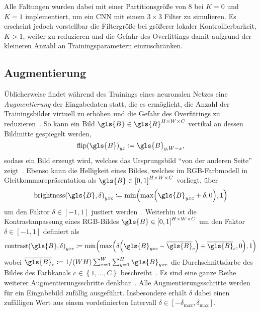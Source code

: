 Alle Faltungen wurden dabei mit einer Partitionsgröße von $8$ bei $K=0$ und $K=1$ implementiert, um ein \gls{CNN} mit einem $3 \times 3$ Filter zu simulieren.
Es erscheint jedoch vorstellbar die Filtergröße bei größerer lokaler Kontrollierbarkeit, \dhe{} $K > 1$, weiter zu reduzieren und die Gefahr des Overfittings damit aufgrund der kleineren Anzahl an Trainingsparametern einzuschränken.

\subsection{Augmentierung}
\label{augmentierung}

Üblicherweise findet während des Trainings eines neuronalen Netzes eine \emph{Augmentierung} der Eingabedaten statt, die es ermöglicht, die Anzahl der Trainingsbilder virtuell zu erhöhen und die Gefahr des Overfittings zu reduzieren~\cite{tensorflow}.
So kann \zB{} ein Bild $\gls{B} \in \gls{R}^{H \times W \times C}$ vertikal an dessen Bildmitte gespiegelt werden, \dhe{}
\begin{equation*}
  {\mathrm{flip}\left(\gls{B}\right)}_{yx} \coloneqq \gls{B}_{y,W-x},
\end{equation*}
sodass ein Bild erzeugt wird, welches das Ursprungsbild \enquote{von der anderen Seite} zeigt~\cite{tensorflow}.
Ebenso kann die Helligkeit eines Bildes, welches im RGB-Farbmodell in Gleitkommarepräsentation als $\gls{B} \in {\left[0, 1\right]}^{H \times W \times C}$ vorliegt, über
\begin{equation*}
  {\mathrm{brightness}\left(\gls{B}, \delta \right)}_{yxc} \coloneqq \min \left( \max \left(\gls{B}_{yxc} + \delta, 0\right), 1\right)
\end{equation*}
um den Faktor $\delta \in \left[-1, 1\right]$ justiert werden~\cite{tensorflow}.
Weiterhin ist die Kontrastanpassung eines RGB-Bildes $\gls{B} \in {\left[0, 1\right]}^{H \times W \times C}$ um den Faktor $\delta \in \left[-1, 1\right]$ definiert als
\begin{equation*}
  {\mathrm{contrast}\left(\gls{B}, \delta\right)}_{yxc} \coloneqq \min \left( \max \left(\delta \left(\gls{B}_{yxc} - \overline{\gls{B}}_c\right) + \overline{\gls{B}}_c, 0\right), 1 \right)
\end{equation*}
wobei $\overline{\gls{B}}_c \coloneqq 1/\left(WH\right) \sum_{x = 1}^W \sum_{y = 1}^H \gls{B}_{yxc}$ die Durchschnittsfarbe des Bildes \bzgl{} des Farbkanals $c \in \left\{1, \ldots, C\right\}$ beschreibt~\cite{tensorflow}.
Es sind eine ganze Reihe weiterer Augmentierungsschritte denkbar~\cite{tensorflow}.
Alle Augmentierungsschritte werden für ein Eingabebild zufällig ausgeführt.
Insbesondere erhält $\delta$ dabei einen zufälligen Wert aus einem vordefinierten Intervall $\delta \in \left[-\delta_{\max}, \delta_{\max}\right]$.


